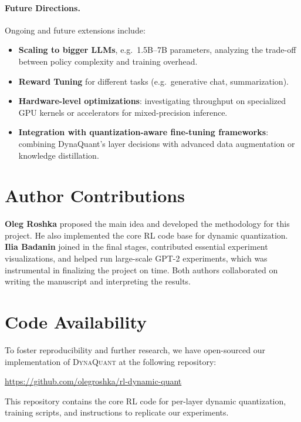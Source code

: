 \documentclass{article}
\begin{document}
	
	\paragraph{Future Directions.}
	Ongoing and future extensions include:
	\begin{itemize}
		\item \textbf{Scaling to bigger LLMs}, e.g.\ 1.5B–7B parameters, analyzing the trade-off between policy complexity and training overhead.
		\item \textbf{Reward Tuning} for different tasks (e.g.\ generative chat, summarization).
		\item \textbf{Hardware-level optimizations}: investigating throughput on specialized GPU kernels or accelerators for mixed-precision inference.
		\item \textbf{Integration with quantization-aware fine-tuning frameworks}: combining DynaQuant's layer decisions with advanced data augmentation or knowledge distillation.
	\end{itemize}
	
	\section{Author Contributions}
	\label{sec:author-contributions}
	
	\textbf{Oleg Roshka} proposed the main idea and developed the methodology for this project. 
	He also implemented the core RL code base for dynamic quantization. 
	\textbf{Ilia Badanin} joined in the final stages, contributed essential experiment visualizations, and helped run large-scale GPT-2 experiments, which was instrumental in finalizing the project on time. 
	Both authors collaborated on writing the manuscript and interpreting the results.

    \section{Code Availability}
    \label{sec:code-availability}
    
    To foster reproducibility and further research, 
    we have open-sourced our implementation of 
    \textsc{DynaQuant} at the following repository:
    
    \url{https://github.com/olegroshka/rl-dynamic-quant}
    
    This repository contains the core RL code for per-layer dynamic quantization, 
    training scripts, and instructions to replicate our experiments.
    	
\end{document}
